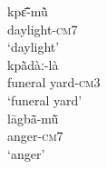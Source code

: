 \documentclass[output=paper]{langscibook}
\begin{document}
 \begin{exe}
    \ex \label{ex:traore:14}
     \begin{multicols}{2}
        \begin{xlist}
            \ex \gll kpɛ̃̄-mũ̀   \\
                daylight-\textsc{cm}7\\
                \trans `daylight'\\
            \ex \gll kpã̀dàː-là\\
               {funeral yard-\textsc{cm}3}\\
              \trans `funeral yard'\\
             \ex \gll lāgbã̄-mũ̄ \\
                anger-\textsc{cm7}\\
                \trans `anger'\\
        \end{xlist}
     \end{multicols}
 \end{exe}
 
\end{document}
